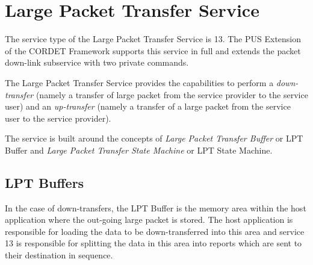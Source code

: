 \documentclass{pnp_article}
\begin{document}








\section{Large Packet Transfer Service}\label{sec:serv13}
The service type of the Large Packet Transfer Service is 13. The PUS Extension of the CORDET Framework supports this service in full and extends the packet down-link subservice with two private commands.

The Large Packet Transfer Service provides the capabilities to perform a \textit{down-transfer} (namely a transfer of large packet from the service provider to the service user) and an \textit{up-transfer} (namely a transfer of a large packet from the service user to the service provider). 

The service is built around the concepts of \textit{Large Packet Transfer Buffer} or LPT Buffer and \textit{Large Packet Transfer State Machine} or LPT State Machine. 

\subsection{LPT Buffers}
In the case of down-transfers, the LPT Buffer is the memory area within the host application where the out-going large packet is stored. The host application is responsible for loading the data to be down-transferred into this area and service 13 is responsible for splitting the data in this area into reports which are sent to their destination in sequence.
\end{document}
